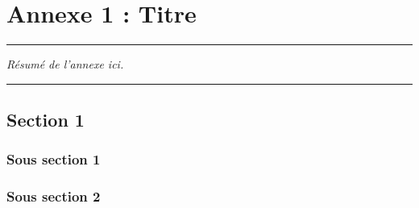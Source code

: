 
\appendix
\renewcommand\chaptername{Annexe/Appendix~}

\lhead[\fancyplain{}{\leftmark}]%
{\fancyplain{}{}} %
\chead[\fancyplain{}{}]%
{\fancyplain{}{}}
\rhead[\fancyplain{}{}]%
{\fancyplain{}{\rightmark}}%
\lfoot[\fancyplain{}{}]%
{\fancyplain{}{}}
\cfoot[\fancyplain{}{\thepage}]%
{\fancyplain{}{\thepage}} %
\rfoot[\fancyplain{}{}]%
{\fancyplain{}{\scriptsize}}



\chapter{Annexe 1 : Titre}
\label{Ann:1}


\begin{center}
	\rule{0.7\linewidth}{.5pt}
	\begin{minipage}{0.7\linewidth}
		\smallskip
		
		\textit{
			Résumé de l'annexe ici.
		}
		
	\end{minipage}
	\smallskip
	\rule{0.7\linewidth}{.5pt}
\end{center}

\minitoc
\newpage

\section{Section 1}
\subsection{Sous section 1}
\blindtext
\subsection{Sous section 2}
\blindtext





